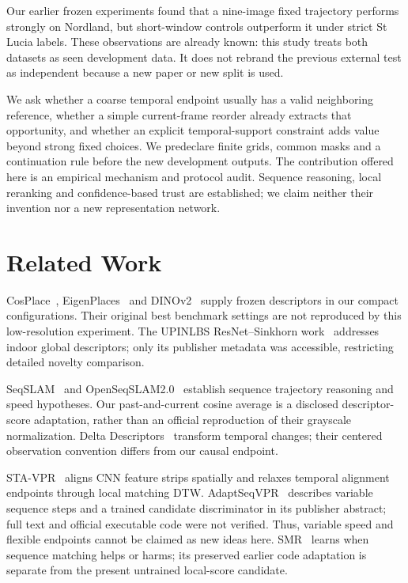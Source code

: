 \documentclass[conference]{IEEEtran}
\begin{document}
Our earlier frozen experiments found that a nine-image fixed trajectory performs strongly on Nordland, but short-window controls outperform it under strict St Lucia labels. These observations are already known: this study treats both datasets as seen development data. It does not rebrand the previous external test as independent because a new paper or new split is used.

We ask whether a coarse temporal endpoint usually has a valid neighboring reference, whether a simple current-frame reorder already extracts that opportunity, and whether an explicit temporal-support constraint adds value beyond strong fixed choices. We predeclare finite grids, common masks and a continuation rule before the new development outputs. The contribution offered here is an empirical mechanism and protocol audit. Sequence reasoning, local reranking and confidence-based trust are established; we claim neither their invention nor a new representation network.

\section{Related Work}
CosPlace~\cite{cosplace}, EigenPlaces~\cite{eigenplaces} and DINOv2~\cite{dinov2} supply frozen descriptors in our compact configurations. Their original best benchmark settings are not reproduced by this low-resolution experiment. The UPINLBS ResNet--Sinkhorn work~\cite{sameconference} addresses indoor global descriptors; only its publisher metadata was accessible, restricting detailed novelty comparison.

SeqSLAM~\cite{seqslam} and OpenSeqSLAM2.0~\cite{openseq} establish sequence trajectory reasoning and speed hypotheses. Our past-and-current cosine average is a disclosed descriptor-score adaptation, rather than an official reproduction of their grayscale normalization. Delta Descriptors~\cite{delta} transform temporal changes; their centered observation convention differs from our causal endpoint.

STA-VPR~\cite{sta} aligns CNN feature strips spatially and relaxes temporal alignment endpoints through local matching DTW. AdaptSeqVPR~\cite{adapt} describes variable sequence steps and a trained candidate discriminator in its publisher abstract; full text and official executable code were not verified. Thus, variable speed and flexible endpoints cannot be claimed as new ideas here. SMR~\cite{smr} learns when sequence matching helps or harms; its preserved earlier code adaptation is separate from the present untrained local-score candidate.
\end{document}
